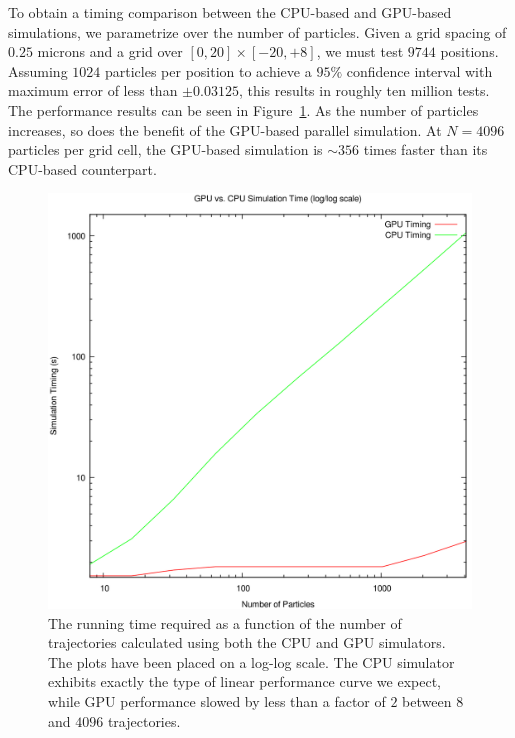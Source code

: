 To obtain a timing comparison between the CPU-based and GPU-based
simulations, we parametrize over the number of particles.  Given a
grid spacing of $0.25$ microns and a grid over $\left[0, 20\right]
\times \left[-20, +8\right]$, we must test $9744$ positions.  
Assuming $1024$ particles per position to achieve a $95\%$ confidence
interval with maximum error of less than $\pm 0.03125$, this results 
in roughly ten million tests. The performance results
can be seen in Figure~\ref{fig:gpu-cpu-performance}.  As the number of
particles increases, so does the benefit of the GPU-based parallel
simulation.  At $N=4096$ particles per grid cell, the GPU-based
simulation is $\sim 356$ times faster than its CPU-based counterpart.


\begin{figure}
\includegraphics[width=\columnwidth]{figures/gpu_cpu_timings.png}
\caption{\label{fig:gpu-cpu-performance}The running time required as a
  function of the number of trajectories calculated using both the CPU
  and GPU simulators.  The plots have been placed on a log-log scale.
  The CPU simulator exhibits exactly the type of linear performance
  curve we expect, while GPU performance slowed by less than a factor
  of $2$ between $8$ and $4096$ trajectories.}
\end{figure}